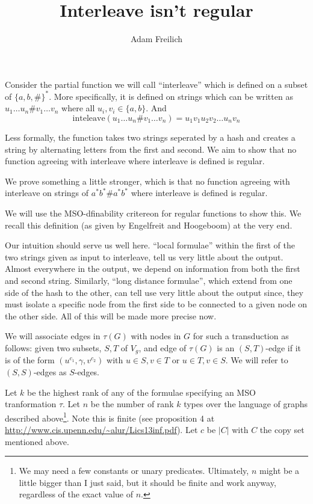 \documentclass[10pt]{IEEEtran}%
\author{Adam Freilich}
\title{Interleave isn't regular}
\begin{document}

Consider the partial function we will call ``interleave'' which is defined on a subset of $\{ a, b, \# \}^*$. More specifically, it is defined on strings which can be written as $u_1\ldots u_n\#v_1 \ldots v_n$ where all $u_i, v_i\in \{a, b\}$. And \[\text{inteleave}(u_1\ldots u_n\#v_1 \ldots v_n) = u_1v_1u_2v_2\ldots u_nv_n\]

Less formally, the function takes two strings seperated by a hash and creates a string by alternating letters from the first and second. We aim to show that no function agreeing with interleave where interleave is defined is regular. 

We prove something a little stronger, which is that no function agreeing with interleave on strings of $a^*b^*\#a^*b^*$ where interleave is defined is regular. 

We will use the MSO-dfinability critereon for regular functions to show this. We recall this definition (as given by Engelfreit and Hoogeboom) at the very end.


Our intuition should serve us well here. ``local formulae'' within the first of the two strings given as input to interleave, tell us very little about the output. Almost everywhere in the output, we depend on information from both the first and second string. Similarly, ``long distance formulae'', which extend from one side of the hash to the other, can tell use very little about the output since, they must isolate a specific node from the first side to be connected to a given node on the other side. All of this will be made more precise now. 

We will associate edges in $\tau(G)$ with nodes in $G$ for such a transduction as follows: given two subsets, $S, T$ of $V_g$, and edge of $\tau(G)$ is an $(S, T)$-edge if it is of the form $(u^{c_1}, \gamma, v^{c_2})$ with $u \in S, v \in T$ or $u \in T, v \in S$. We will refer to $(S, S)$-edges as $S$-edges. 

Let $k$ be the highest rank of any of the formulae specifying an MSO tranformation $\tau$. Let $n$ be the number of rank $k$ types over the language of graphs described above\footnote{We may need a few constants or unary predicates. Ultimately, $n$ might be a little bigger than I just said, but it should be finite and work anyway, regardless of the exact value of $n$.}. Note this is finite (see proposition 4 at \url{http://www.cis.upenn.edu/~alur/Lics13inf.pdf}). Let $c$ be $|C|$ with $C$ the copy set mentioned above. 
\end{document}
